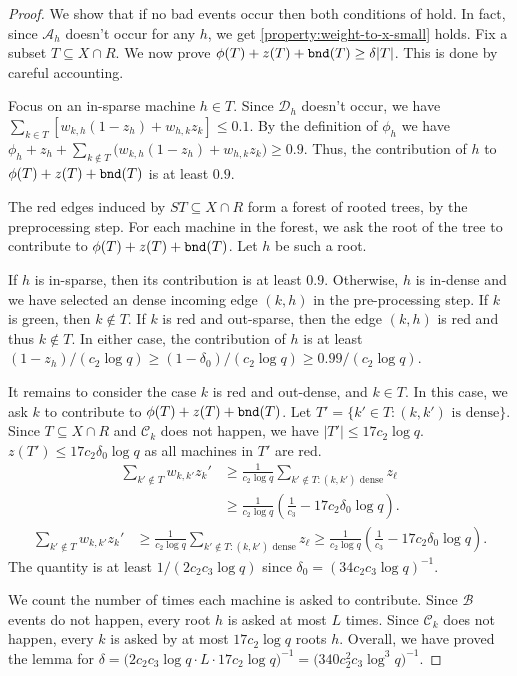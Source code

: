 \documentclass[11pt]{article}
\newcounter{prop}
\newcommand{\calB}{{\mathscr B}}
\newcommand{\cA}{{\mathscr A}}
\newcommand{\cC}{{\mathscr C}}
\newcommand{\cD}{\mathscr{D}}
\begin{document}
\begin{proof}
We show that if no bad events occur then both conditions of  hold. In fact, since $\cA_h$ doesn't occur for any $h$, we get \ref{property:weight-to-x-small} holds.  Fix a subset $T \subseteq X\cap R$.  We now prove $\phi(T) + z(T) + {\tt bnd}(T) \geq \delta|T|$.   This is done by careful accounting.


Focus on an in-sparse machine $h \in T$.  Since $\cD_h$ doesn't occur, we have $\sum_{k \in T}[w_{k,h}(1-z_h)  + w_{h,k}z_k] \leq 0.1$.  By the definition of $\phi_h$ we have $\phi_h + z_h + \sum_{k \notin T}\big(w_{k,h}(1-z_h)  + w_{h,k}z_k\big) \geq 0.9$. Thus, the contribution of $h$ to $\phi(T) + z(T) + {\tt bnd}(T)$ is at least $0.9$.









The red edges induced by $ST\subseteq X \cap R$ form a forest of rooted trees, by the preprocessing step.   For each machine in the forest, we ask the root of the tree to contribute to $\phi(T) + z(T) + {\tt bnd}(T)$. Let $h$ be such a root.

If $h$ is in-sparse, then its contribution is at least $0.9$. Otherwise, $h$ is in-dense and we have selected an dense incoming edge $(k, h)$ in the pre-processing step.  If $k$ is green, then $k \notin T$.  If $k$ is red and out-sparse, then the edge $(k, h)$ is red and thus $k \notin T$.  In either case, the contribution of $h$ is at least $(1-z_h)/(c_2\log q) \geq (1-\delta_0)/(c_2 \log q) \geq 0.99/(c_2 \log q)$. 

It remains to consider the case $k$ is red and out-dense, and $k \in T$. In this case, we ask $k$ to contribute to $\phi(T) + z(T) + {\tt bnd}(T)$.   Let $T' = \{k' \in T :(k, k')\text{ is dense}\}$. Since  $T \subseteq X \cap R$ and $\cC_k$ does not happen, we have $|T'| \leq 17c_2 \log q$. $z(T') \leq 17c_2\delta_0\log q$ as all machines in $T'$ are red.
\ifdefined\CR
\begin{align*}
\sum_{k' \notin T}w_{k,k'}z_k' &\geq  \frac{1}{c_2\log q} \sum_{ k' \notin T:(k, k') \text{ dense}}z_\ell\\ &\geq \frac{1}{c_2\log q}\left(\frac{1}{c_3}-17c_2\delta_0\log q\right).
\end{align*}
\else
\begin{align*}
\sum_{k' \notin T}w_{k,k'}z_k' &\geq  \frac{1}{c_2\log q} \sum_{ k' \notin T:(k, k') \text{ dense}}z_\ell
\geq \frac{1}{c_2\log q}\left(\frac{1}{c_3}-17c_2\delta_0\log q\right).
\end{align*}
\fi
The quantity is at least $1/(2c_2c_3\log q)$ since  $\delta_0 = (34c_2c_3\log q)^{-1}$.

We count the number of times each machine is asked to contribute.  Since  $\calB$ events do not happen, every root $h$ is asked at most $L$ times.  Since $\cC_k$ does not happen, every $k$ is asked by at most $17c_2\log q$ roots $h$. Overall,  we have proved the lemma for $\delta = \big(2c_2c_3\log q\cdot L \cdot 17c_2\log q\big)^{-1} = \big(340c_2^2c_3\log^3q\big)^{-1}$.

\end{proof}
\end{document}
